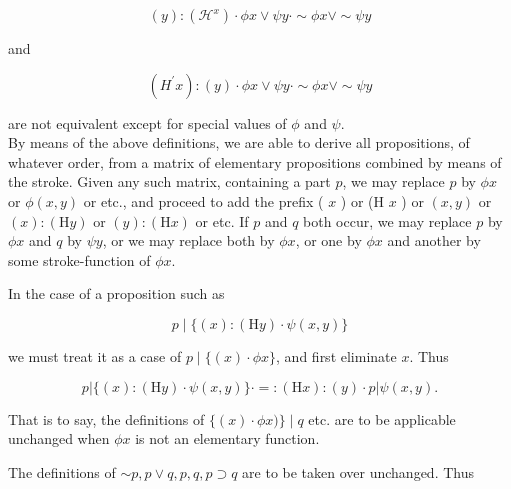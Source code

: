 \documentclass[10pt]{article}
\begin{document}
$$
(y):\left(\mathcal{H}^{x}\right) \cdot \phi x \vee \psi y \cdot \sim \phi x \vee \sim \psi y
$$

and

$$
\left(H^{\prime} x\right):(y) \cdot \phi x \vee \psi y \cdot \sim \phi x \vee \sim \psi y
$$

are not equivalent except for special values of $\phi$ and $\psi$.\\
By means of the above definitions, we are able to derive all propositions, of whatever order, from a matrix of elementary propositions combined by means of the stroke. Given any such matrix, containing a part $p$, we may replace $p$ by $\phi x$ or $\phi(x, y)$ or etc., and proceed to add the prefix ( $x$ ) or (H $x$ ) or $(x, y)$ or $(x):(\mathrm{H} y)$ or $(y):(\mathrm{H} x)$ or etc. If $p$ and $q$ both occur, we may replace $p$ by $\phi x$ and $q$ by $\psi y$, or we may replace both by $\phi x$, or one by $\phi x$ and another by some stroke-function of $\phi x$.

In the case of a proposition such as

$$
p \mid\{(x):(\mathrm{H} y) \cdot \psi(x, y)\}
$$

we must treat it as a case of $p \mid\{(x) \cdot \phi x\}$, and first eliminate $x$. Thus

$$
p|\{(x):(\mathrm{H} y) \cdot \psi(x, y)\} \cdot=:(\mathrm{H} x):(y) \cdot p| \psi(x, y) .
$$

That is to say, the definitions of $\{(x) \cdot \phi x)\} \mid q$ etc. are to be applicable unchanged when $\phi x$ is not an elementary function.

The definitions of $\sim p, p \vee q, p, q, p \supset q$ are to be taken over unchanged. Thus
\end{document}
